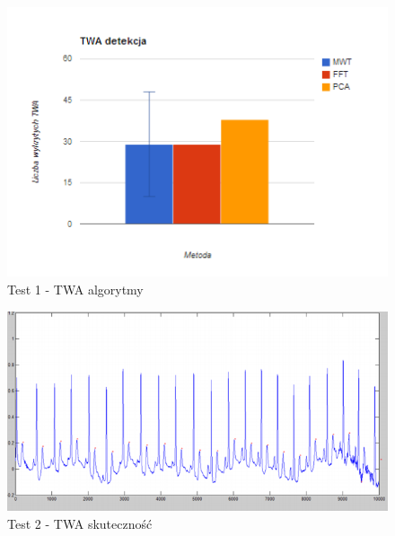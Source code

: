 \documentclass[a4paper, 11pt]{article}
\begin{document}
\begin{center}
%
\begin{figure}
\begin{centering}
\includegraphics[scale=0.4]{include/twa_2}
\par\end{centering}

\caption{Test 1 - TWA algorytmy}
\label{fig:twa_2}
\end{figure}

\par\end{center}


\begin{center}
%
\begin{figure}
\begin{centering}
\includegraphics[scale=0.4]{include/twa_3}
\par\end{centering}

\caption{Test 2 - TWA skuteczność}
\label{fig:twa_3}
\end{figure}

\par\end{center}
\end{document}
